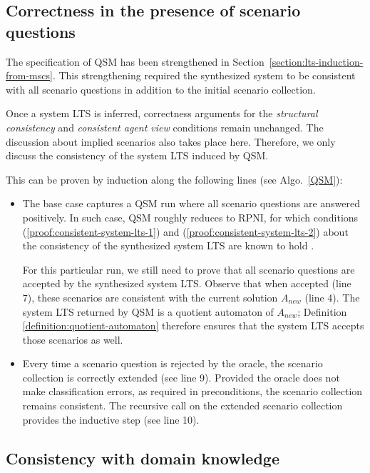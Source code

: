 
\subsection{Correctness in the presence of scenario questions\label{subsection:proof-with-scenario-questions}}

The specification of QSM has been strengthened in Section~\ref{section:lts-induction-from-mscs}. This strengthening required the synthesized system to be consistent with all scenario questions in addition to the initial scenario collection. 

Once a system LTS is inferred, correctness arguments for the \emph{structural consistency} and \emph{consistent agent view} conditions remain unchanged. The discussion about implied scenarios also takes place here. Therefore, we only discuss the consistency of the system LTS induced by QSM.

This can be proven by induction along the following lines (see Algo.~\ref{QSM}):
\begin{itemize}
\item The base case captures a QSM run where all scenario questions are answered positively. In such case, QSM roughly reduces to RPNI, for which conditions (\ref{proof:consistent-system-lts-1}) and (\ref{proof:consistent-system-lts-2}) about the consistency of the synthesized system LTS are known to hold \cite{Oncina:1993}.

For this particular run, we still need to prove that all scenario questions are accepted by the synthesized system LTS. Observe that when accepted (line 7), these scenarios are consistent with the current solution $A_{new}$ (line 4). The system LTS returned by QSM is a quotient automaton of $A_{new}$; Definition \ref{definition:quotient-automaton} therefore ensures that the system LTS accepts those scenarios as well.
\item Every time a scenario question is rejected by the oracle, the scenario collection is correctly extended (see line 9). Provided the oracle does not make classification errors, as required in preconditions, the scenario collection remains consistent. The recursive call on the extended scenario collection provides the inductive step (see line 10).
\end{itemize}


\subsection{Consistency with domain knowledge\label{subsection:proof-with-domain-knowledge}}

